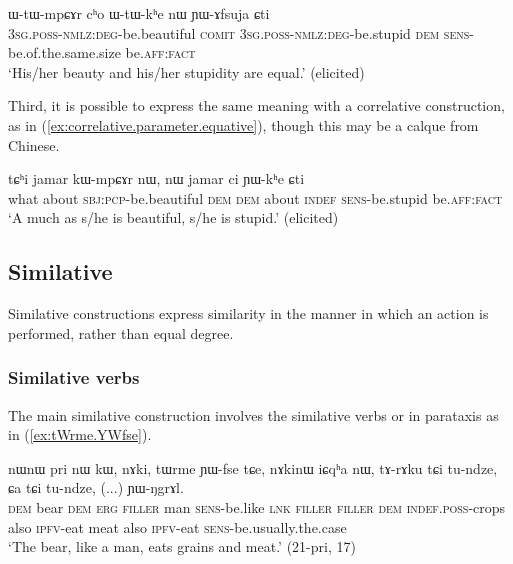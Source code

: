 \begin{exe}
\ex \label{ex:WtWmpCAr.cho.WtWkhe.YAfsuja}
\gll ɯ-tɯ-mpɕɤr cʰo ɯ-tɯ-kʰe nɯ ɲɯ-ɤfsuja ɕti\\
\textsc{3sg}.\textsc{poss}-\textsc{nmlz}:\textsc{deg}-be.beautiful \textsc{comit} \textsc{3sg}.\textsc{poss}-\textsc{nmlz}:\textsc{deg}-be.stupid \textsc{dem} \textsc{sens}-be.of.the.same.size be.\textsc{aff}:\textsc{fact} \\
\glt `His/her beauty and his/her stupidity are equal.' (elicited)
\end{exe}

Third, it is possible to express the same meaning with a correlative construction, as in (\ref{ex:correlative.parameter.equative}), though this may be a calque from Chinese.

\begin{exe}
\ex \label{ex:correlative.parameter.equative}
\gll tɕʰi jamar kɯ-mpɕɤr nɯ, nɯ jamar ci ɲɯ-kʰe ɕti \\
what about \textsc{sbj}:\textsc{pcp}-be.beautiful \textsc{dem} \textsc{dem} about \textsc{indef} \textsc{sens}-be.stupid be.\textsc{aff}:\textsc{fact} \\
\glt `A much as s/he is beautiful, s/he is stupid.' (elicited)
\end{exe}

  
\subsection{Similative} \label{sec:similative}
Similative constructions express similarity in the manner in which an action is performed, rather than equal degree.

\subsubsection{Similative verbs} \label{sec:svc.deixis}

The main similative construction involves the similative verbs  or  in parataxis as in (\ref{ex:tWrme.YWfse}).

\begin{exe}
\ex \label{ex:tWrme.YWfse}
\gll nɯnɯ pri nɯ kɯ, nɤki, tɯrme ɲɯ-fse tɕe, nɤkinɯ iɕqʰa nɯ, tɤ-rɤku tɕi tu-ndze, ɕa tɕi tu-ndze, (...)  ɲɯ-ŋgrɤl. \\
\textsc{dem} bear \textsc{dem} \textsc{erg} \textsc{filler} man \textsc{sens}-be.like \textsc{lnk} \textsc{filler} \textsc{filler} \textsc{dem} \textsc{indef}.\textsc{poss}-crops also \textsc{ipfv}-eat meat also \textsc{ipfv}-eat { } \textsc{sens}-be.usually.the.case \\
\glt `The bear, like a man, eats grains and meat.' (21-pri, 17)
\end{exe}

